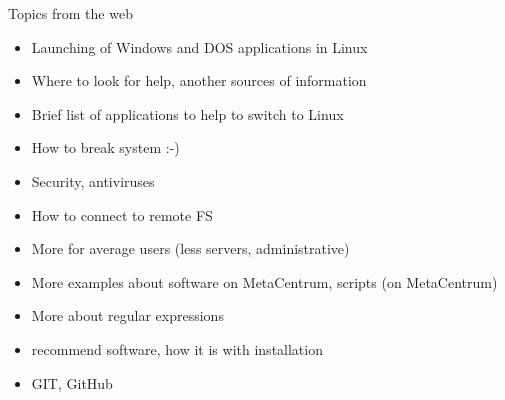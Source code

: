 \documentclass[compress, ucs, xelatex, 11pt, xcolor=svgnames,
  hyperref={
    bookmarks=true,
    unicode=true,
    colorlinks=true,
    pdftitle={Linux, command line and MetaCentrum},
    plainpages=false,
    pdfauthor={Vojtech Zeisek},
    pdfsubject={Course about use of Linux command line, writing shell scripts and using MetaCentrum of CESNET},
    pdfcreator={XeLaTeX, http://www.xelatex.org/},
    pdfkeywords={Linux, GNU, BASH, shell, command line, MetaCentrum},
    linkcolor=Sienna,
    anchorcolor=black,
    citecolor=green,
    filecolor=magenta,
    menucolor=Sienna,
    urlcolor=cyan,
    pdftex},
  url={hyphens, lowtilde} %
  ]{beamer}
\begin{document}
\begin{frame}[allowframebreaks]{Topics from the web}
\begin{itemize}
    \item Launching of Windows and DOS applications in Linux
    \item Where to look for help, another sources of information
    \item Brief list of applications to help to switch to Linux
    \item How to break system :-)
    \item Security, antiviruses
    \item How to connect to remote FS
    \item More for average users (less servers, administrative)
    \item More examples about software on MetaCentrum, scripts (on MetaCentrum)
    \item More about regular expressions
    \item recommend software, how it is with installation
    \item GIT, GitHub
\end{itemize}
\end{frame}
\end{document}
